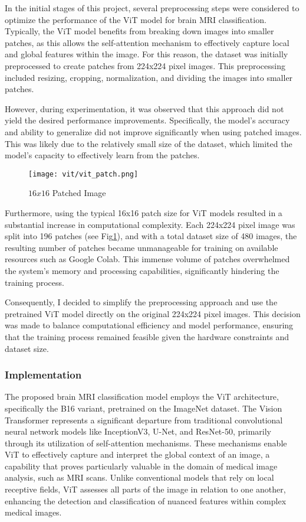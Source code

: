 In the initial stages of this project, several preprocessing steps were considered to optimize the performance of the ViT model for brain MRI classification. Typically, the ViT model benefits from breaking down images into smaller patches, as this allows the self-attention mechanism to effectively capture local and global features within the image. For this reason, the dataset was initially preprocessed to create patches from 224x224 pixel images. This preprocessing included resizing, cropping, normalization, and dividing the images into smaller patches.

However, during experimentation, it was observed that this approach did not yield the desired performance improvements. Specifically, the model's accuracy and ability to generalize did not improve significantly when using patched images. This was likely due to the relatively small size of the dataset, which limited the model's capacity to effectively learn from the patches. 

\begin{figure}[H]
  \centering
  \texttt{[image: vit/vit\_patch.png]}
  \caption{$16x16$ Patched Image}
  \label{fig:vit_patch}
\end{figure}

Furthermore, using the typical 16x16 patch size for ViT models \cite{Wang2021Not} resulted in a substantial increase in computational complexity. Each 224x224 pixel image was split into 196 patches (see Fig\ref{fig:vit_patch}), and with a total dataset size of 480 images, the resulting number of patches became unmanageable for training on available resources such as Google Colab. This immense volume of patches overwhelmed the system's memory and processing capabilities, significantly hindering the training process.

Consequently, I decided to simplify the preprocessing approach and use the pretrained ViT model directly on the original 224x224 pixel images. This decision was made to balance computational efficiency and model performance, ensuring that the training process remained feasible given the hardware constraints and dataset size.

\subsubsection{Implementation}

The proposed brain MRI classification model employs the ViT architecture, specifically the B16 variant, pretrained on the ImageNet dataset. The Vision Transformer represents a significant departure from traditional convolutional neural network models like InceptionV3, U-Net, and ResNet-50, primarily through its utilization of self-attention mechanisms. These mechanisms enable ViT to effectively capture and interpret the global context of an image, a capability that proves particularly valuable in the domain of medical image analysis, such as MRI scans. Unlike conventional models that rely on local receptive fields, ViT assesses all parts of the image in relation to one another, enhancing the detection and classification of nuanced features within complex medical images.


